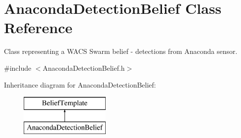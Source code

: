 \hypertarget{class_anaconda_detection_belief}{
\section{AnacondaDetectionBelief Class Reference}
\label{class_anaconda_detection_belief}
}


Class representing a WACS Swarm belief -\/ detections from Anaconda sensor.  




{\ttfamily \#include $<$AnacondaDetectionBelief.h$>$}

Inheritance diagram for AnacondaDetectionBelief:\begin{figure}[H]
\begin{center}
\leavevmode
\includegraphics[height=2.000000cm]{class_anaconda_detection_belief}
\end{center}
\end{figure}
